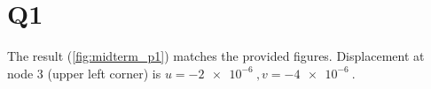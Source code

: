 \pagestyle{fancy}
\setlength{\headheight}{16pt}
\fancyhead{} %
\fancyfoot{} %
\fancyfoot[C]{\thepage}

\newcommand{\ca}[1]{\textcolor{Maroon}{#1}}
\newcommand{\cb}[1]{\textcolor{RoyalBlue}{#1}}
\newcommand{\cc}[1]{\textcolor{PineGreen}{#1}}
\newcommand{\cd}[1]{\textcolor{Plum}{#1}}

\newcommand{\Fint}{\ensuremath{\bv{F}^{\textrm{int}}}}
\newcommand{\Fext}{\ensuremath{\bv{F}^{\textrm{ext}}}}

\section*{Q1}
The result (\cref{fig:midterm_p1}) matches the provided figures. 
Displacement at node 3 (upper left corner) is $u = \qty{-2e-6}{}, v = \qty{-4e-6}{}$. 
